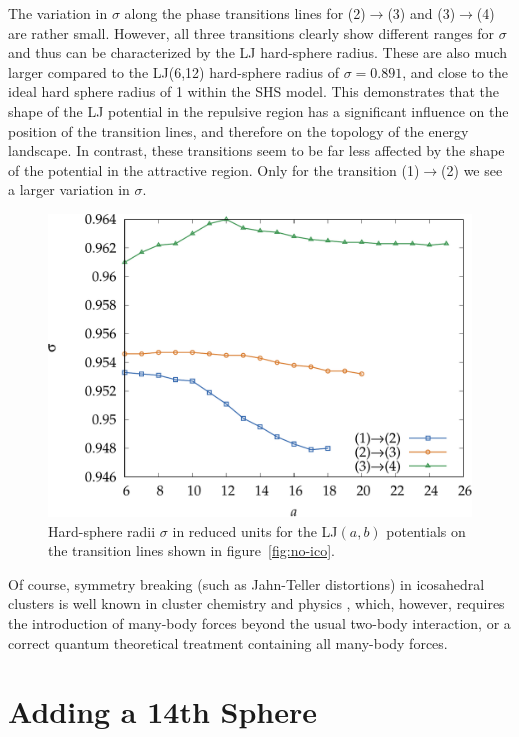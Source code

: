 The variation in $\sigma$ along the phase transitions lines for (2)$\rightarrow$(3)
and (3)$\rightarrow$(4) are rather small. However, all three
transitions clearly show different ranges for $\sigma$ and thus can be
characterized by the LJ hard-sphere radius. These are also
much larger compared to the LJ(6,12) hard-sphere radius of $\sigma=0.891$,
and close to the ideal hard sphere radius of 1 within the SHS model. 
This demonstrates that the shape of the LJ potential in the
repulsive region has a significant influence on the position of the transition lines, 
and therefore on the topology of the energy landscape. In contrast, these 
transitions seem to be far less affected by the shape of the potential in the attractive region. 
Only for the transition (1)$\rightarrow$(2) we see a larger variation in $\sigma$.
\begin{figure}[htb]\centering
    \includegraphics[width=.8\columnwidth]{gregory-newton/sigma.pdf}
    \caption{Hard-sphere radii $\sigma$ in reduced units for the LJ$(a,b)$
    potentials on the transition lines shown in figure~\ref{fig:no-ico}.}
    \label{fig:hardsphere}
\end{figure}

Of course, symmetry breaking (such as Jahn-Teller distortions) in icosahedral
clusters is well known in cluster chemistry and physics
\autocite{deHeer_physicssimplemetal_1993}, which, however, requires the
introduction of many-body forces beyond the usual two-body interaction, or a
correct quantum theoretical treatment containing all many-body forces. 

\section{Adding a 14th Sphere}
\label{sec:addinga14thsphere}

